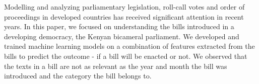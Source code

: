 Modelling and analyzing parliamentary legislation, roll-call votes and order of proceedings in developed countries has received significant attention in recent years. In this paper, we focused on understanding the bills introduced in a developing democracy, the Kenyan bicameral parliament. We developed and trained machine learning models on a combination of features extracted from the bills to predict the outcome - if a bill will be enacted or not. We observed that the texts in a bill are not as relevant as the year and month the bill was introduced and the category the bill belongs to.
